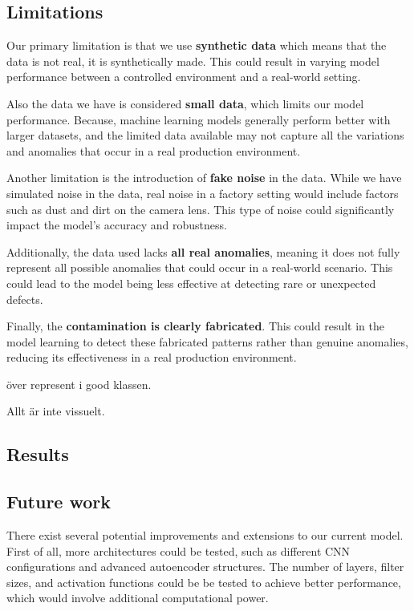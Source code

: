 \subsection{Limitations}

Our primary limitation is that we use \textbf{synthetic data} which means that the data is not real, it is synthetically made.
This could result in varying model performance between a controlled environment and a real-world setting.

Also the data we have is considered \textbf{small data}, which limits our model performance. 
Because, machine learning models generally perform better with larger datasets, and the limited data available may not capture all the variations and anomalies that occur in a real production environment.

Another limitation is the introduction of \textbf{fake noise} in the data.
While we have simulated noise in the data, real noise in a factory setting would include factors such as dust and dirt on the camera lens. 
This type of noise could significantly impact the model's accuracy and robustness.

Additionally, the data used lacks \textbf{all real anomalies}, meaning it does not fully represent all possible anomalies that could occur in a real-world scenario. 
This could lead to the model being less effective at detecting rare or unexpected defects.

Finally, the \textbf{contamination is clearly fabricated}.
This could result in the model learning to detect these fabricated patterns rather than genuine anomalies, reducing its effectiveness in a real production environment.

över represent i good klassen.

Allt är inte vissuelt.
\subsection{Results}

\subsection{Future work}
There exist several potential improvements and extensions to our current model. 
First of all, more architectures could be tested, such as different CNN configurations and advanced autoencoder structures. 
The number of layers, filter sizes, and activation functions could be be tested to achieve better performance, which would involve additional computational power.

